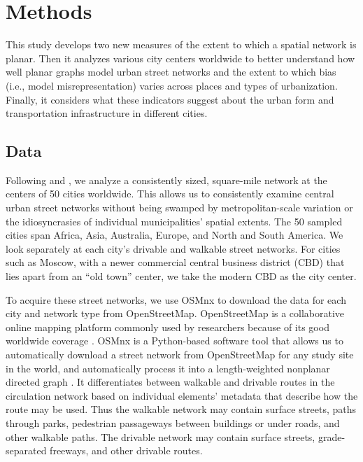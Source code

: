 \documentclass[Afour,sageh,times]{sagej}
\begin{document}
\section{Methods}

This study develops two new measures of the extent to which a spatial network is planar. Then it analyzes various city centers worldwide to better understand how well planar graphs model urban street networks and the extent to which bias (i.e., model misrepresentation) varies across places and types of urbanization. Finally, it considers what these indicators suggest about the urban form and transportation infrastructure in different cities.

\subsection{Data}

Following \citet{jacobs_great_1995} and \citet{cardillo_structural_2006}, we analyze a consistently sized, square-mile network at the centers of 50 cities worldwide. This allows us to consistently examine central urban street networks without being swamped by metropolitan-scale variation or the idiosyncrasies of individual municipalities' spatial extents. The 50 sampled cities span Africa, Asia, Australia, Europe, and North and South America. We look separately at each city's drivable and walkable street networks. For cities such as Moscow, with a newer commercial central business district (CBD) that lies apart from an \enquote{old town} center, we take the modern CBD as the city center.

To acquire these street networks, we use OSMnx to download the data for each city and network type from OpenStreetMap. OpenStreetMap is a collaborative online mapping platform commonly used by researchers because of its good worldwide coverage \citep{haklay_how_2010,jokar_arsanjani_openstreetmap_2015}. OSMnx is a Python-based software tool that allows us to automatically download a street network from OpenStreetMap for any study site in the world, and automatically process it into a length-weighted nonplanar directed graph \citep{boeing_osmnx:_2017}. It differentiates between walkable and drivable routes in the circulation network based on individual elements' metadata that describe how the route may be used. Thus the walkable network may contain surface streets, paths through parks, pedestrian passageways between buildings or under roads, and other walkable paths. The drivable network may contain surface streets, grade-separated freeways, and other drivable routes.
\end{document}
